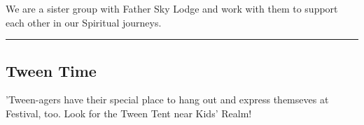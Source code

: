 \documentclass[9pt,twoside,openright,final,article,letterpaper]{memoir}
\renewcommand{\pfbreakdisplay}{%
  \needspace{24pt}%
  \vspace{8pt}\\\ding{76}\quad\ding{77}\quad\ding{78}\\%
  \vspace{11pt}}
\let\oldsubsection=\subsection
\renewcommand{\subsection}[1]{%
  \vspace{6pt}
  \needspace{1.25in}
  \oldsubsection{#1}
  \nopagebreak}
\begin{document}
\begin{multicols}{3}
  We are a sister group with Father Sky Lodge and work with them to
  support each other in our Spiritual journeys.

  \endgroup

  \fancybreak{\pfbreakdisplay}

  \subsection{Tween Time}

  'Tween-agers have their special place to hang out and express
  themseves at Festival, too. Look for the Tween Tent near Kids' Realm!



\end{multicols}
\end{document}
